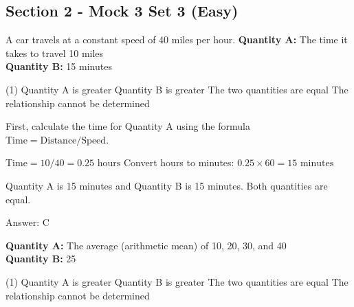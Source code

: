 \documentclass[11pt,paper=a4,answers]{exam}
\begin{document}
\begin{questions}
\pointsinrightmargin
\pointsdroppedatright
\marksnotpoints
{}
\pointformat{\boldmath\themarginpoints}
\bracketedpoints


\section*{Section 2 - Mock 3 Set 3 (Easy)}


\question
A car travels at a constant speed of 40 miles per hour.
\vspace{5pt}
\textbf{Quantity A: } The time it takes to travel 10 miles \\
\vspace{5pt}
\textbf{Quantity B: } 15 minutes

\begin{tasks}(1)
\task[A)] Quantity A is greater
\task[B)] Quantity B is greater
\task[C)] The two quantities are equal
\task[D)] The relationship cannot be determined
\end{tasks}

\begin{solution}
First, calculate the time for Quantity A using the formula $\text{Time} = \text{Distance} / \text{Speed}$.
\vspace{5pt}
\begin{center}
$\text{Time} = 10 / 40 = 0.25 \text{ hours}$
\vspace{5pt}
Convert hours to minutes: $0.25 \times 60 = 15 \text{ minutes}$
\end{center}
\vspace{5pt}
Quantity A is 15 minutes and Quantity B is 15 minutes. Both quantities are equal.

Answer: \colorbox{yellow!100}{C}
\end{solution}

\vspace{1cm}

\question
\textbf{Quantity A: } The average (arithmetic mean) of 10, 20, 30, and 40 \\
\vspace{5pt}
\textbf{Quantity B: } 25

\begin{tasks}(1)
\task[A)] Quantity A is greater
\task[B)] Quantity B is greater
\task[C)] The two quantities are equal
\task[D)] The relationship cannot be determined
\end{tasks}


\end{questions}
\end{document}
